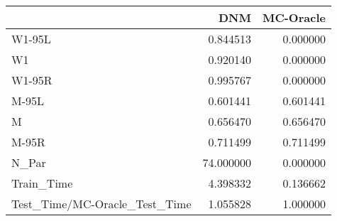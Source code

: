 \begin{tabular}{lrr}
\toprule
{} &        DNM &  MC-Oracle \\
\midrule
W1-95L                        &   0.844513 &   0.000000 \\
W1                            &   0.920140 &   0.000000 \\
W1-95R                        &   0.995767 &   0.000000 \\
M-95L                         &   0.601441 &   0.601441 \\
M                             &   0.656470 &   0.656470 \\
M-95R                         &   0.711499 &   0.711499 \\
N\_Par                         &  74.000000 &   0.000000 \\
Train\_Time                    &   4.398332 &   0.136662 \\
Test\_Time/MC-Oracle\_Test\_Time &   1.055828 &   1.000000 \\
\bottomrule
\end{tabular}
